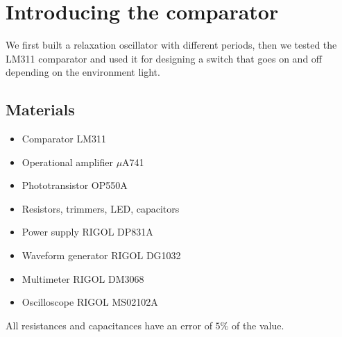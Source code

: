 
\chapter{Introducing the comparator}
We first built a relaxation oscillator with different periods, then we tested the LM311 comparator and used it for designing a switch that goes on and off depending on the environment light.

\section{Materials}
\begin{itemize}
\item Comparator LM311
\item Operational amplifier $\mu$A741
\item Phototransistor OP550A
\item Resistors, trimmers, LED, capacitors
\item Power supply RIGOL DP831A
\item Waveform generator RIGOL DG1032
\item Multimeter RIGOL DM3068
\item Oscilloscope RIGOL MS02102A
\end{itemize}
All resistances and capacitances have an error of $5\%$ of the value.

